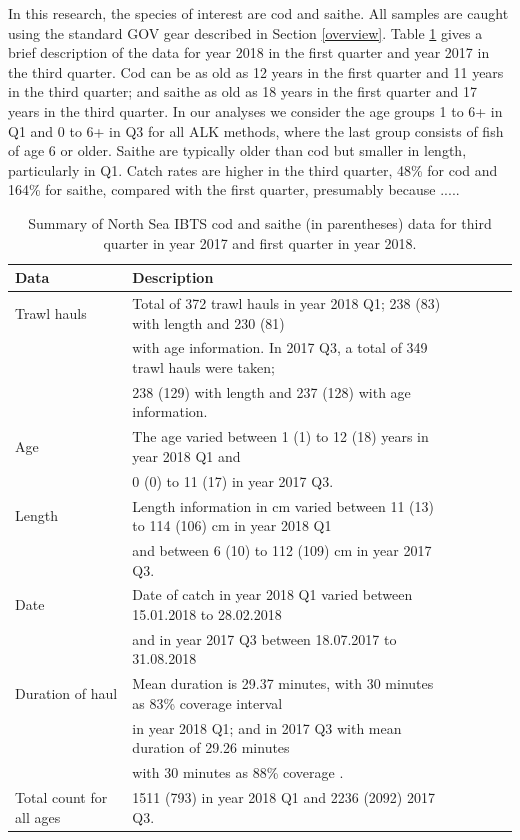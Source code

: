 \documentclass[a4paper 12pt]{article}
\numberwithin{equation}{section}
\begin{document}
In this research, the species of interest are cod and saithe. All samples are caught using the standard GOV gear described in Section \ref{overview}. Table \ref{tab:data2018} gives a brief description of the data for year 2018 in the first quarter and year 2017 in the third quarter.  Cod can be as old as 12 years in the first quarter and 11 years in the third quarter; and saithe as old as 18 years in the first quarter and 17 years in the third quarter. In our analyses we consider the age groups 1 to 6+ in Q1 and 0 to 6+ in Q3 for all ALK methods, where the last group consists of fish of age 6 or older. Saithe are typically older than cod but smaller in length, particularly in Q1. Catch rates are higher in the third quarter, 48\% for cod and 164\% for saithe, compared with the first quarter, presumably because .....

\begin{small}
\begin{table}[h!]
\caption{Summary of North Sea IBTS cod and saithe (in parentheses) data for third quarter in year 2017 and first quarter in year 2018.}
\begin{tabular}{llllll}
\toprule
\bf Data&\bf Description \\
\midrule
Trawl hauls  & Total of 372 trawl hauls in year 2018 Q1; 238 (83)  with length and 230 (81) \\ & with age information. In 2017 Q3, a total of 349 trawl hauls were taken; \\ & 238 (129) with length and 237 (128) with age information. \\[1.7ex]

Age &The age varied between 1 (1) to 12 (18) years in year 2018 Q1 and \\ & 0 (0) to 11 (17) in year 2017 Q3. \\[1.7ex]

Length & Length information in cm varied between 11 (13) to 114 (106) cm in year 2018 Q1 \\ & and between 6 (10) to 112 (109) cm in year 2017 Q3. \\[1.7ex]

Date&Date of catch in year 2018 Q1 varied between 15.01.2018 to 28.02.2018 \\ & and in year 2017 Q3 between 18.07.2017 to 31.08.2018 \\[1.7ex]

Duration of haul & Mean duration is 29.37 minutes, with 30 minutes as 83\% coverage interval \\ & in year 2018 Q1; and in 2017 Q3 with mean duration of 29.26 minutes \\ & with 30 minutes as 88\% coverage . \\[1.7ex]

Total count for all ages & 1511 (793) in year 2018 Q1 and 2236 (2092) 2017 Q3. \\[0.5ex]
\bottomrule
\end{tabular}
\label{tab:data2018}
\end{table}
\end{small}
\end{document}
